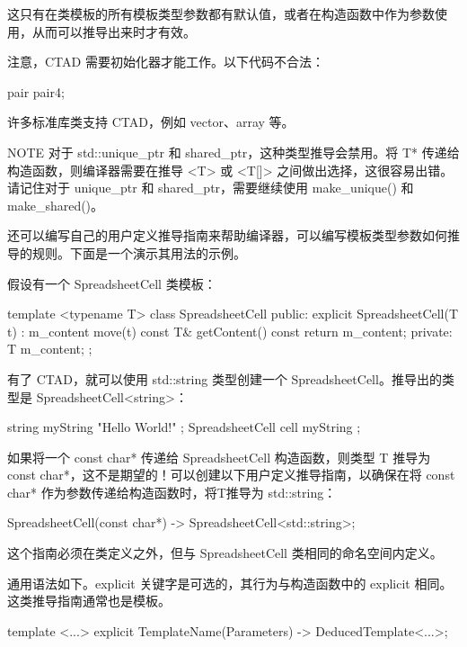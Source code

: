 这只有在类模板的所有模板类型参数都有默认值，或者在构造函数中作为参数使用，从而可以推导出来时才有效。

注意，CTAD 需要初始化器才能工作。以下代码不合法：

\begin{cpp}
pair pair4;
\end{cpp}

许多标准库类支持 CTAD，例如 vector、array 等。

\begin{myNotic}{NOTE}
对于 std::unique\_ptr 和 shared\_ptr，这种类型推导会禁用。将 T* 传递给构造函数，则编译器需要在推导 <T> 或 <T[]> 之间做出选择，这很容易出错。请记住对于 unique\_ptr 和 shared\_ptr，需要继续使用 make\_unique() 和 make\_shared()。
\end{myNotic}


还可以编写自己的用户定义推导指南来帮助编译器，可以编写模板类型参数如何推导的规则。下面是一个演示其用法的示例。

假设有一个 SpreadsheetCell 类模板：

\begin{cpp}
template <typename T>
class SpreadsheetCell
{
    public:
        explicit SpreadsheetCell(T t) : m_content { move(t) } { }
        const T& getContent() const { return m_content; }
    private:
        T m_content;
};
\end{cpp}

有了 CTAD，就可以使用 std::string 类型创建一个 SpreadsheetCell。推导出的类型是 SpreadsheetCell<string>：

\begin{cpp}
string myString { "Hello World!" };
SpreadsheetCell cell { myString };
\end{cpp}

如果将一个 const char* 传递给 SpreadsheetCell 构造函数，则类型 T 推导为 const char*，这不是期望的！可以创建以下用户定义推导指南，以确保在将 const char* 作为参数传递给构造函数时，将T推导为 std::string：

\begin{cpp}
SpreadsheetCell(const char*) -> SpreadsheetCell<std::string>;
\end{cpp}

这个指南必须在类定义之外，但与 SpreadsheetCell 类相同的命名空间内定义。

通用语法如下。explicit 关键字是可选的，其行为与构造函数中的 explicit 相同。这类推导指南通常也是模板。

\begin{cpp}
template <...>
explicit TemplateName(Parameters) -> DeducedTemplate<...>;
\end{cpp}


